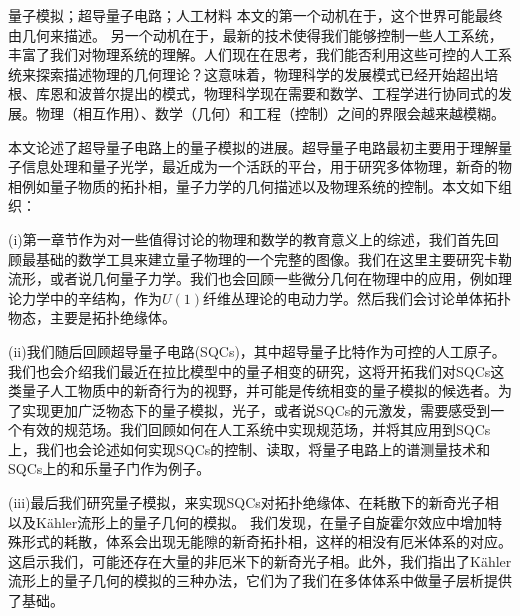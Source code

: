 \documentclass[supercite]{HustGraduPaper}
\begin{document}
	\begin{cnabstract}{量子模拟；超导量子电路；人工材料}
		本文的第一个动机在于，这个世界可能最终由几何来描述\cite{weinberg1994dreams}。 另一个动机在于，最新的技术使得我们能够控制一些人工系统，丰富了我们对物理系统的理解\cite{GU20171}。人们现在在思考，我们能否利用这些可控的人工系统来探索描述物理的几何理论？这意味着，物理科学的发展模式已经开始超出培根、库恩和波普尔提出的模式\cite{popper2005logic,kuhn2012structure,descartes1987discours,bacon1878novum}，物理科学现在需要和数学、工程学进行协同式的发展。物理（相互作用）、数学（几何）和工程（控制）之间的界限会越来越模糊。
		
		本文论述了超导量子电路上的量子模拟的进展。超导量子电路最初主要用于理解量子信息处理和量子光学，最近成为一个活跃的平台，用于研究多体物理，新奇的物相例如量子物质的拓扑相，量子力学的几何描述以及物理系统的控制。本文如下组织：
		
		(i)第一章节作为对一些值得讨论的物理和数学的教育意义上的综述，我们首先回顾最基础的数学工具来建立量子物理的一个完整的图像。我们在这里主要研究卡勒流形，或者说几何量子力学。我们也会回顾一些微分几何在物理中的应用，例如理论力学中的辛结构，作为$U(1)$纤维丛理论的电动力学。然后我们会讨论单体拓扑物态，主要是拓扑绝缘体。
		
		(ii)我们随后回顾超导量子电路(SQCs)，其中超导量子比特作为可控的人工原子。我们也会介绍我们最近在拉比模型中的量子相变的研究，这将开拓我们对SQCs这类量子人工物质中的新奇行为的视野，并可能是传统相变的量子模拟的候选者。为了实现更加广泛物态下的量子模拟，光子，或者说SQCs的元激发，需要感受到一个有效的规范场。我们回顾如何在人工系统中实现规范场，并将其应用到SQCs上，我们也会论述如何实现SQCs的控制、读取，将量子电路上的谱测量技术和SQCs上的和乐量子门作为例子。
		
		(iii)最后我们研究量子模拟，来实现SQCs对拓扑绝缘体、在耗散下的新奇光子相以及Kähler流形上的量子几何的模拟。	我们发现，在量子自旋霍尔效应中增加特殊形式的耗散，体系会出现无能隙的新奇拓扑相，这样的相没有厄米体系的对应。这启示我们，可能还存在大量的非厄米下的新奇光子相。此外，我们指出了Kähler流形上的量子几何的模拟的三种办法，它们为了我们在多体体系中做量子层析提供了基础。
		
	\end{cnabstract}
\end{document}

